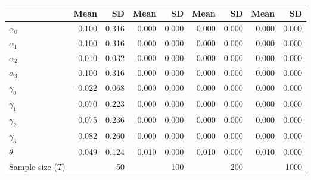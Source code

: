 
\begin{tabular}[t]{lrrrrrrrr}
\toprule
  & Mean & SD & Mean  & SD  & Mean   & SD   & Mean    & SD   \\
\midrule
$\alpha_{0}$ & 0.100 & 0.316 & 0.000 & 0.000 & 0.000 & 0.000 & 0.000 & 0.000\\
$\alpha_{1}$ & 0.100 & 0.316 & 0.000 & 0.000 & 0.000 & 0.000 & 0.000 & 0.000\\
$\alpha_{2}$ & 0.010 & 0.032 & 0.000 & 0.000 & 0.000 & 0.000 & 0.000 & 0.000\\
$\alpha_{3}$ & 0.100 & 0.316 & 0.000 & 0.000 & 0.000 & 0.000 & 0.000 & 0.000\\
$\gamma_{0}$ & -0.022 & 0.068 & 0.000 & 0.000 & 0.000 & 0.000 & 0.000 & 0.000\\
$\gamma_{1}$ & 0.070 & 0.223 & 0.000 & 0.000 & 0.000 & 0.000 & 0.000 & 0.000\\
$\gamma_{2}$ & 0.075 & 0.236 & 0.000 & 0.000 & 0.000 & 0.000 & 0.000 & 0.000\\
$\gamma_{3}$ & 0.082 & 0.260 & 0.000 & 0.000 & 0.000 & 0.000 & 0.000 & 0.000\\
$\theta$ & 0.049 & 0.124 & 0.010 & 0.000 & 0.010 & 0.000 & 0.010 & 0.000\\
Sample size ($T$) &  & 50 &  & 100 &  & 200 &  & 1000\\
\bottomrule
\end{tabular}
